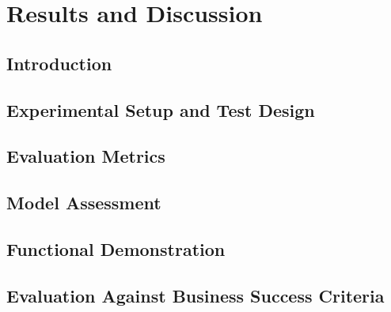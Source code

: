 \chapter{Results and Discussion}
\label{chap:results}

\section{Introduction}

\section{Experimental Setup and Test Design}

\section{Evaluation Metrics}

\section{Model Assessment}

\section{Functional Demonstration}

\section{Evaluation Against Business Success Criteria}
\label{sec:business-evaluation}

